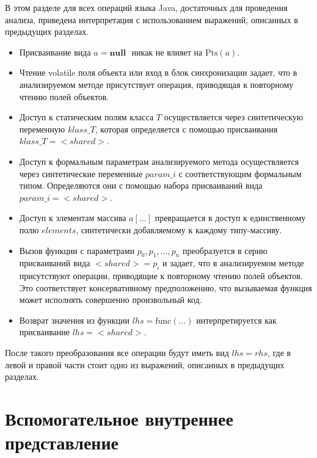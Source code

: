 \documentclass[14pt,titlepage]{extarticle}
\newcommand{\NULL}{\textbf{null }}
\newcommand{\Pts}[1]{\textrm{Pts}(#1)}
\newcommand{\eng}[1]{{\English#1}}
\let\oldsection\section
\renewcommand{\section}{\newpage\oldsection}
\newcommand{\java}{\eng{Java}\xspace}
\begin{document}
        В этом разделе для всех операций языка \java, достаточных для
        проведения анализа, приведена интерпретация с использованием выражений,
        описанных в предыдущих разделах.
        \begin{itemize}
          \item Присваивание вида $a = \NULL$ никак не влияет на $\Pts{a}$.
          \item Чтение \eng{volatile} поля объекта или вход в
                блок синхронизации задает, что в анализируемом методе
                присутствует операция, приводящая к повторному чтению полей
                объектов.
          \item Доступ к статическим полям класса $T$ осуществляется через
                синтетическую переменную $klass\_T$, которая определяется с
                помощью присваивания $klass\_T = {<}shared{>}$.
          \item Доступ к формальным параметрам анализируемого метода
                осуществляется через синтетические переменные $param\_i$ с
                соответствующим формальным типом.
                Определяются они с помощью набора присваиваний вида
                $param\_i = {<}shared{>}$.
          \item Доступ к элементам массива $a[\ldots]$ превращается в доступ к
                единственному полю $elements$, синтетически добавляемому к
                каждому типу-массиву.
          \item Вызов функции с параметрами $p_0, p_1, \ldots, p_n$
                преобразуется в серию присваиваний вида ${<}shared{>} = p_i$ и
                задает, что в анализируемом методе присутствуют операции,
                приводящие к повторному чтению полей объектов. Это
                соответствует консервативному предположению, что вызываемая
                функция может исполнять совершенно произвольный код.
          \item Возврат значения из функции $lhs = \textrm{func}(\ldots)$
                интерпретируется как присваивание $lhs = {<}shared{>}$.
        \end{itemize}
        После такого преобразования все операции будут иметь вид $lhs = rhs$,
        где в левой и правой части стоит одно из выражений, описанных в
        предыдущих разделах.

  \section{Вспомогательное внутреннее представление}
    \label{section:analysis_aux_ir}
\end{document}
